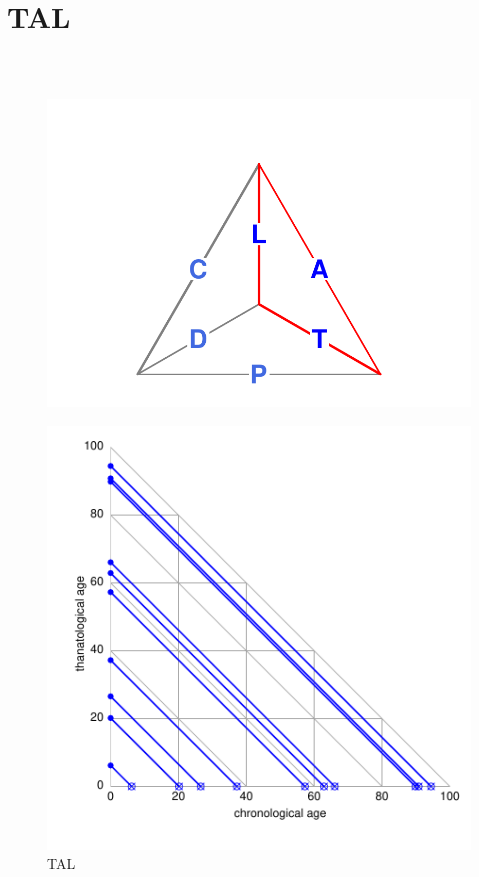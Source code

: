 \documentclass[20pt]{beamer}
\begin{document}
\section{TAL}
\begin{frame}
\frametitle{~}
\vspace{-5em}
\begin{figure}
\raggedleft
    \includegraphics[scale=.7]{Figures/TetraTALprg.pdf}
\end{figure}
\vspace{-5em}
\begin{figure}[b]
    \centering
    \caption{TAL}
    \includegraphics{Figures/LabPres/ATL2.pdf}
\end{figure} 
\end{frame}
\end{document}
